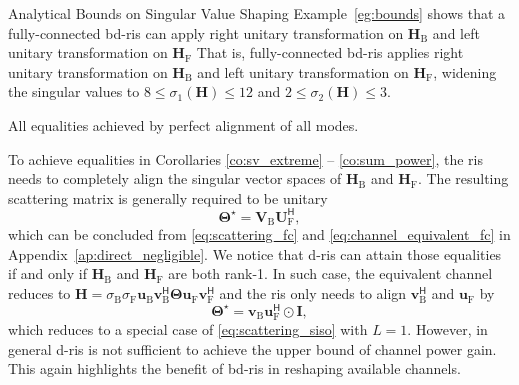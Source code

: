 \documentclass[journal]{IEEEtran}
\begin{document}
\begin{section}{Analytical Bounds on Singular Value Shaping}
		Example~\ref{eg:bounds} shows that a fully-connected \gls{bd}-\gls{ris} can apply right unitary transformation on $\mathbf{H}_\mathrm{B}$ and left unitary transformation on $\mathbf{H}_\mathrm{F}$
		That is, fully-connected \gls{bd}-\gls{ris} applies right unitary transformation on $\mathbf{H}_\mathrm{B}$ and left unitary transformation on $\mathbf{H}_\mathrm{F}$, widening the singular values to $8 \le \sigma_1(\mathbf{H}) \le 12$ and $2 \le \sigma_2(\mathbf{H}) \le 3$.








		All equalities achieved by perfect alignment of all modes.

		To achieve equalities in Corollaries \ref{co:sv_extreme} -- \ref{co:sum_power}, the \gls{ris} needs to completely align the singular vector spaces of $\mathbf{H}_\mathrm{B}$ and $\mathbf{H}_\mathrm{F}$.
		The resulting scattering matrix is generally required to be unitary
		\begin{equation}
			\mathbf{\Theta}^\star = \mathbf{V}_\mathrm{B} \mathbf{U}_\mathrm{F}^\mathsf{H},
			\label{eq:scattering_fc_optimal}
		\end{equation}
		which can be concluded from \eqref{eq:scattering_fc} and \eqref{eq:channel_equivalent_fc} in Appendix~\ref{ap:direct_negligible}.
		We notice that \gls{d}-\gls{ris} can attain those equalities if and only if $\mathbf{H}_\mathrm{B}$ and $\mathbf{H}_\mathrm{F}$ are both rank-1.
		In such case, the equivalent channel reduces to $\mathbf{H} = \sigma_\mathrm{B} \sigma_\mathrm{F} \mathbf{u}_\mathrm{B} \mathbf{v}_\mathrm{B}^\mathsf{H} \mathbf{\Theta} \mathbf{u}_\mathrm{F} \mathbf{v}_\mathrm{F}^\mathsf{H}$ and the \gls{ris} only needs to align $\mathbf{v}_\mathrm{B}^\mathsf{H}$ and $\mathbf{u}_\mathrm{F}$ by
		\begin{equation}
			\mathbf{\Theta}^\star = \mathbf{v}_\mathrm{B} \mathbf{u}_\mathrm{F}^\mathsf{H} \odot \mathbf{I},
		\end{equation}
		which reduces to a special case of \eqref{eq:scattering_siso} with $L=1$.
		However, in general \gls{d}-\gls{ris} is not sufficient to achieve the upper bound of channel power gain.
		This again highlights the benefit of \gls{bd}-\gls{ris} in reshaping available channels.


\end{section}
\end{document}
